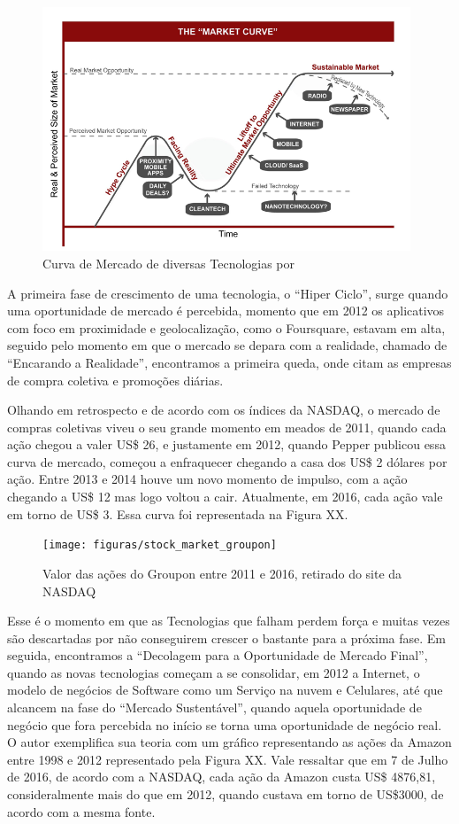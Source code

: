\begin{figure}[!htb]
\centering
\includegraphics[width=11cm,angle=0]{figuras/market_curve}
\caption{Curva de Mercado de diversas Tecnologias por \cite{Pepper2012}}
\label{Rotulo}
\end{figure}

A primeira fase de crescimento de uma tecnologia, o ``Hiper Ciclo'', surge quando uma oportunidade de mercado é percebida, momento que em 2012 os aplicativos com foco em proximidade e geolocalização, como o Foursquare, estavam em alta, seguido pelo momento em que o mercado se depara com a realidade, chamado de ``Encarando a Realidade'', encontramos a primeira queda, onde citam as empresas de compra coletiva e promoções diárias.

Olhando em retrospecto e de acordo com os índices da NASDAQ, o mercado de compras coletivas viveu o seu grande momento em meados de 2011, quando cada ação chegou a valer US\$ 26, e justamente em 2012, quando Pepper publicou essa curva de mercado, começou a enfraquecer chegando a casa dos US\$ 2 dólares por ação. Entre 2013 e 2014 houve um novo momento de impulso, com a ação chegando a US\$ 12 mas logo voltou a cair. Atualmente, em 2016, cada ação vale em torno de US\$ 3. Essa curva foi representada na Figura XX.

\begin{figure}[!htb]
\centering
\texttt{[image: figuras/stock\_market\_groupon]}
\caption{Valor das ações do Groupon entre 2011 e 2016, retirado do site da NASDAQ}
\label{Rotulo}
\end{figure}

Esse é o momento em que as Tecnologias que falham perdem força e muitas vezes são descartadas por não conseguirem crescer o bastante para a próxima fase. Em seguida, encontramos a ``Decolagem para a Oportunidade de Mercado Final'', quando as novas tecnologias começam a se consolidar, em 2012 a Internet, o modelo de negócios de Software como um Serviço na nuvem e Celulares, até que alcancem na fase do ``Mercado Sustentável'', quando aquela oportunidade de negócio que fora percebida no início se torna uma oportunidade de negócio real. O autor exemplifica sua teoria com um gráfico representando as ações da Amazon entre 1998 e 2012 representado pela Figura XX. Vale ressaltar que em 7 de Julho de 2016, de acordo com a NASDAQ, cada ação da Amazon custa US\$ 4876,81, consideralmente mais do que em 2012, quando custava em torno de US\$3000, de acordo com a mesma fonte.

